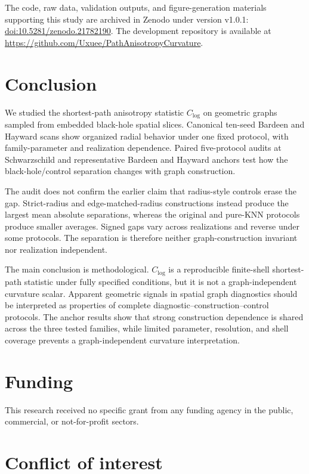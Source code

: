 \documentclass[11pt]{article}
\newcommand{\clog}{C_{\log}}
\begin{document}
The code, raw data, validation outputs, and figure-generation materials
supporting this study are archived in Zenodo under version v1.0.1:
\href{https://doi.org/10.5281/zenodo.21782190}{doi:10.5281/zenodo.21782190}.
The development repository is available at
\url{https://github.com/Uxuee/PathAnisotropyCurvature}.

\section{Conclusion}

We studied the shortest-path anisotropy statistic $\clog$ on geometric graphs
sampled from embedded black-hole spatial slices. Canonical ten-seed Bardeen and
Hayward scans show organized radial behavior under one fixed protocol, with
family-parameter and realization dependence. Paired five-protocol audits at
Schwarzschild and representative Bardeen and Hayward anchors test how the
black-hole/control separation changes with graph construction.

The audit does not confirm the earlier claim that radius-style controls erase
the gap. Strict-radius and edge-matched-radius constructions instead produce the
largest mean absolute separations, whereas the original and pure-KNN protocols
produce smaller averages. Signed gaps vary across realizations and reverse under
some protocols. The separation is therefore neither graph-construction
invariant nor realization independent.

The main conclusion is methodological. $\clog$ is a reproducible finite-shell
shortest-path statistic under fully specified conditions, but it is not a
graph-independent curvature scalar. Apparent geometric signals in spatial graph
diagnostics should be interpreted as properties of complete
 diagnostic--construction--control protocols. The anchor results show that
strong construction dependence is shared across the three tested families,
while limited parameter, resolution, and shell coverage prevents a
graph-independent curvature interpretation.

\section*{Funding}

This research received no specific grant from any funding agency in the
public, commercial, or not-for-profit sectors.

\section*{Conflict of interest}
\end{document}
